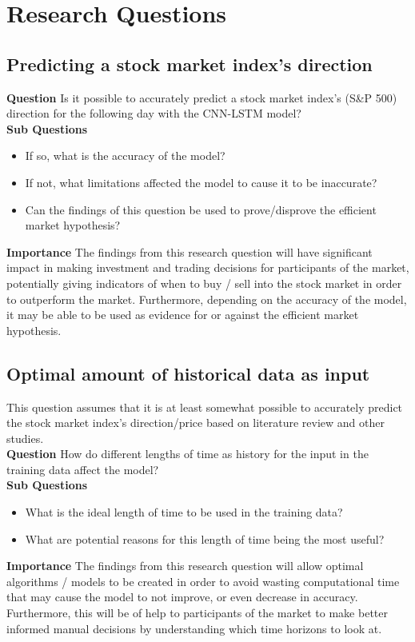\chapter{Research Questions} \label{chap:research-questions}


\section{Predicting a stock market index's direction}
\textbf{Question} Is it possible to accurately predict a stock market index's (S\&P 500) direction for
the following day with the CNN-LSTM model?\\
\textbf{Sub Questions}
\begin{itemize}
    \item If so, what is the accuracy of the model?
    \item If not, what limitations affected the model to cause it to be inaccurate?
    \item Can the findings of this question be used to prove/disprove the efficient market hypothesis?
\end{itemize}
\textbf{Importance} The findings from this research question will have significant impact in making
investment and trading decisions for participants of the market, potentially giving indicators of
when to buy / sell into the stock market in order to outperform the market. Furthermore, depending
on the accuracy of the model, it may be able to be used as evidence for or against the efficient
market hypothesis.

\section{Optimal amount of historical data as input}
This question assumes that it is at least somewhat possible to accurately predict the stock market index's
direction/price based on literature review and other studies.\\
\textbf{Question} How do different lengths of time as history for the input in the training data affect the model?\\
\textbf{Sub Questions}
\begin{itemize}
    \item What is the ideal length of time to be used in the training data?
    \item What are potential reasons for this length of time being the most useful?
\end{itemize}
\textbf{Importance} The findings from this research question will allow optimal algorithms /
models to be created in order to avoid wasting computational time that may cause the model to 
not improve, or even decrease in accuracy. Furthermore, this will be of help to participants of
the market to make better informed manual decisions by understanding which time horizons to look
at.


